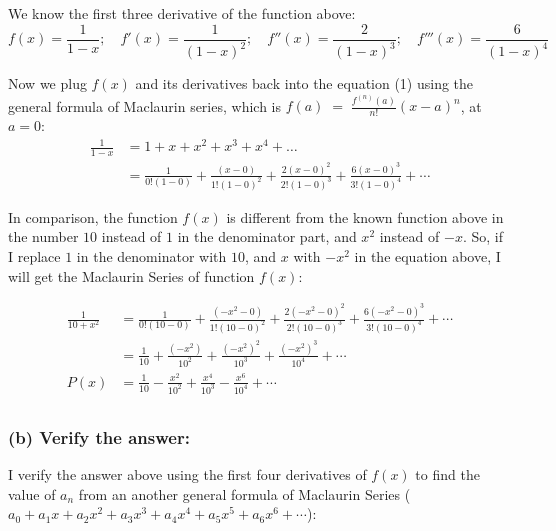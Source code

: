 \documentclass[12pt]{article}
\begin{document}
\noindent We know the first three derivative of the function above:
$$
    f(x) = \frac{1}{1-x};\quad
    f'(x) = \frac{1}{\left(1-x \right)^2};\quad
    f''(x) = \frac{2}{\left(1-x \right)^3};\quad
    f'''(x) = \frac{6}{\left(1-x \right)^4}
$$

\noindent Now we plug $f(x)$ and its derivatives back into the equation (1) using the general formula of Maclaurin series, which is $\displaystyle f(a) \;=\; \frac{f^{(n)}(a)}{n!} \left(x-a \right)^n $, at $a=0$:
\begin{align*}
    \frac{1}{1-x} &= 1+ x+ x^2+ x^3+ x^4+ \dots\\
    &= \frac{1}{0! \left(1- 0 \right)}
    + \frac{\left(x- 0 \right)}{1! \left(1- 0 \right)^2}
    + \frac{2 \left(x- 0 \right)^2}{2! \left(1- 0 \right)^3}
    + \frac{6 \left(x- 0 \right)^3}{3! \left(1- 0 \right)^4}
    + \cdots
\end{align*}

\noindent In comparison, the function $f(x)$ is different from the known function above in the number $10$ instead of $1$ in the denominator part, and $x^2$ instead of $-x$. So, if I replace $1$ in the denominator with $10$, and $x$ with $-x^2$ in the equation above, I will get the Maclaurin Series of function $f(x)$:

\begin{align*}
    \frac{1}{10+x^2} &= 
    \frac{1}{0! \left(10- 0 \right)}
    + \frac{\left(-x^2- 0 \right)}{1! \left(10- 0 \right)^2}
    + \frac{2 \left(-x^2- 0 \right)^2}{2! \left(10- 0 \right)^3}
    + \frac{6 \left(-x^2- 0 \right)^3}{3! \left(10- 0 \right)^4}
    + \cdots\\
    &= \frac{1}{10}
    + \frac{\left(-x^2 \right)}{10^2}
    + \frac{\left(-x^2 \right)^2}{10^3}
    + \frac{\left(-x^2 \right)^3}{10^4}
    + \cdots\\
    P(x)&= \frac{1}{10}
    - \frac{x^2}{10^2}
    + \frac{x^4}{10^3}
    - \frac{x^6}{10^4}
    + \cdots\\
\end{align*}


\subsubsection*{(b) Verify the answer:}

\noindent I verify the answer above using the first four derivatives of $f(x)$ to find the value of $a_n$ from an another general formula of Maclaurin Series ($\displaystyle a_0+ a_1x+ a_2x^2+ a_3x^3+ a_4x^4+ a_5x^5+ a_6x^6+ \cdots$):
\end{document}
